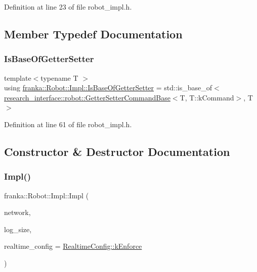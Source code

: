 Definition at line 23 of file robot\+\_\+impl.\+h.



\subsection{Member Typedef Documentation}
\mbox{\label{classfranka_1_1Robot_1_1Impl_a42d57d169b53c906439dbbde255c1bae}} 
\subsubsection{\texorpdfstring{Is\+Base\+Of\+Getter\+Setter}{IsBaseOfGetterSetter}}
{\footnotesize\ttfamily template$<$typename T $>$ \\
using \hyperlink{classfranka_1_1Robot_1_1Impl_a42d57d169b53c906439dbbde255c1bae}{franka\+::\+Robot\+::\+Impl\+::\+Is\+Base\+Of\+Getter\+Setter} =  std\+::is\+\_\+base\+\_\+of$<$\hyperlink{structresearch__interface_1_1robot_1_1GetterSetterCommandBase}{research\+\_\+interface\+::robot\+::\+Getter\+Setter\+Command\+Base}$<$T, T\+::k\+Command$>$, T$>$\hspace{0.3cm}{\ttfamily [private]}}



Definition at line 61 of file robot\+\_\+impl.\+h.



\subsection{Constructor \& Destructor Documentation}
\mbox{\label{classfranka_1_1Robot_1_1Impl_a091452543a9ef4ce4e347911bc14fbc1}} 
\subsubsection{\texorpdfstring{Impl()}{Impl()}}
{\footnotesize\ttfamily franka\+::\+Robot\+::\+Impl\+::\+Impl (\begin{DoxyParamCaption}\item[{std\+::unique\+\_\+ptr$<$ \hyperlink{classfranka_1_1Network}{Network} $>$}]{network,  }\item[{size\+\_\+t}]{log\+\_\+size,  }\item[{\hyperlink{namespacefranka_aeede4f4629390fea21ca5e5a35a8a943}{Realtime\+Config}}]{realtime\+\_\+config = {\ttfamily \hyperlink{namespacefranka_aeede4f4629390fea21ca5e5a35a8a943a024bd586d70db805d622b85815bfa0de}{Realtime\+Config\+::k\+Enforce}} }\end{DoxyParamCaption})\hspace{0.3cm}{\ttfamily [explicit]}}



